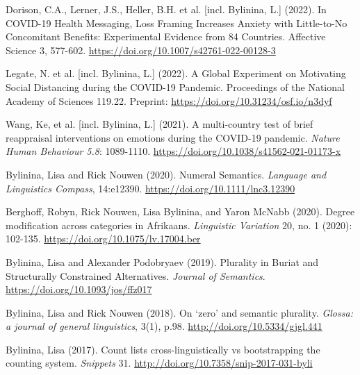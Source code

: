 \documentclass[12pt,letterpaper]{article}
\begin{document}
\small{
\begin{hangparas}{.25in}{1} 

Dorison, C.A., Lerner, J.S., Heller, B.H. et al. [incl. Bylinina, L.] (2022). In COVID-19 Health Messaging, Loss Framing Increases Anxiety with Little-to-No Concomitant Benefits: Experimental Evidence from 84 Countries.  Affective Science 3, 577-602. \url{https://doi.org/10.1007/s42761-022-00128-3}

\vspace{1mm} 

Legate, N. et al. [incl. Bylinina, L.] (2022). A Global Experiment on Motivating Social Distancing during the COVID-19 Pandemic. Proceedings of the National Academy of Sciences 119.22. Preprint: \url{https://doi.org/10.31234/osf.io/n3dyf}

\vspace{1mm} 

Wang, Ke, et al. [incl. Bylinina, L.] (2021). A multi-country test of brief reappraisal interventions on emotions during the COVID-19 pandemic. {\it Nature Human Behaviour 5.8}: 1089-1110. \url{https://doi.org/10.1038/s41562-021-01173-x}

\vspace{1mm} 

Bylinina, Lisa and Rick Nouwen (2020). Numeral Semantics. {\it Language and Linguistics Compass}, 14:e12390. \url{https://doi.org/10.1111/lnc3.12390}

\vspace{1mm} 

Berghoff, Robyn, Rick Nouwen, Lisa Bylinina, and Yaron McNabb (2020). Degree modification across categories in Afrikaans. {\it Linguistic Variation} 20, no. 1 (2020): 102-135.  \url{https://doi.org/10.1075/lv.17004.ber}

\vspace{1mm} 

Bylinina, Lisa and Alexander Podobryaev (2019). Plurality in Buriat and Structurally Constrained Alternatives. {\it Journal of Semantics}. \url{https://doi.org/10.1093/jos/ffz017}

\vspace{1mm} 

Bylinina, Lisa and Rick Nouwen (2018). On `zero' and semantic plurality. {\it Glossa: a journal of general linguistics}, 3(1), p.98. \url{http://doi.org/10.5334/gjgl.441}

\vspace{1mm} 

Bylinina, Lisa (2017). Count lists cross-linguistically vs bootstrapping the counting system. {\it Snippets} 31. \url{http://doi.org/10.7358/snip-2017-031-byli} 


\end{hangparas}}
\end{document}
